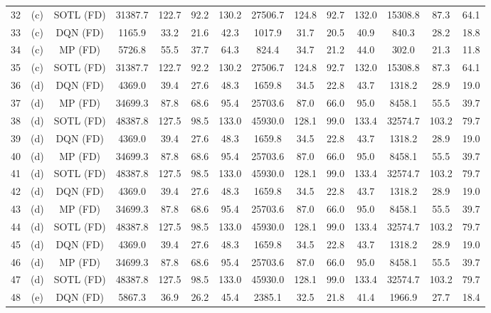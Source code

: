 \begin{table}[htbp]
\begin{tabular}{|c|c|c|c|c|c|c|c|c|c|c|c|c|c|}
32 &  (c) &  SOTL (FD) & 31387.7 & 122.7 &  92.2 & 130.2 & 27506.7 & 124.8 &  92.7 & 132.0 & 15308.8 &  87.3 & 64.1 \\
33 &  (c) &   DQN (FD) &  1165.9 &  33.2 &  21.6 &  42.3 &  1017.9 &  31.7 &  20.5 &  40.9 &   840.3 &  28.2 & 18.8 \\
34 &  (c) &    MP (FD) &  5726.8 &  55.5 &  37.7 &  64.3 &   824.4 &  34.7 &  21.2 &  44.0 &   302.0 &  21.3 & 11.8 \\
35 &  (c) &  SOTL (FD) & 31387.7 & 122.7 &  92.2 & 130.2 & 27506.7 & 124.8 &  92.7 & 132.0 & 15308.8 &  87.3 & 64.1 \\
36 &  (d) &   DQN (FD) &  4369.0 &  39.4 &  27.6 &  48.3 &  1659.8 &  34.5 &  22.8 &  43.7 &  1318.2 &  28.9 & 19.0 \\
37 &  (d) &    MP (FD) & 34699.3 &  87.8 &  68.6 &  95.4 & 25703.6 &  87.0 &  66.0 &  95.0 &  8458.1 &  55.5 & 39.7 \\
38 &  (d) &  SOTL (FD) & 48387.8 & 127.5 &  98.5 & 133.0 & 45930.0 & 128.1 &  99.0 & 133.4 & 32574.7 & 103.2 & 79.7 \\
39 &  (d) &   DQN (FD) &  4369.0 &  39.4 &  27.6 &  48.3 &  1659.8 &  34.5 &  22.8 &  43.7 &  1318.2 &  28.9 & 19.0 \\
40 &  (d) &    MP (FD) & 34699.3 &  87.8 &  68.6 &  95.4 & 25703.6 &  87.0 &  66.0 &  95.0 &  8458.1 &  55.5 & 39.7 \\
41 &  (d) &  SOTL (FD) & 48387.8 & 127.5 &  98.5 & 133.0 & 45930.0 & 128.1 &  99.0 & 133.4 & 32574.7 & 103.2 & 79.7 \\
42 &  (d) &   DQN (FD) &  4369.0 &  39.4 &  27.6 &  48.3 &  1659.8 &  34.5 &  22.8 &  43.7 &  1318.2 &  28.9 & 19.0 \\
43 &  (d) &    MP (FD) & 34699.3 &  87.8 &  68.6 &  95.4 & 25703.6 &  87.0 &  66.0 &  95.0 &  8458.1 &  55.5 & 39.7 \\
44 &  (d) &  SOTL (FD) & 48387.8 & 127.5 &  98.5 & 133.0 & 45930.0 & 128.1 &  99.0 & 133.4 & 32574.7 & 103.2 & 79.7 \\
45 &  (d) &   DQN (FD) &  4369.0 &  39.4 &  27.6 &  48.3 &  1659.8 &  34.5 &  22.8 &  43.7 &  1318.2 &  28.9 & 19.0 \\
46 &  (d) &    MP (FD) & 34699.3 &  87.8 &  68.6 &  95.4 & 25703.6 &  87.0 &  66.0 &  95.0 &  8458.1 &  55.5 & 39.7 \\
47 &  (d) &  SOTL (FD) & 48387.8 & 127.5 &  98.5 & 133.0 & 45930.0 & 128.1 &  99.0 & 133.4 & 32574.7 & 103.2 & 79.7 \\
48 &  (e) &   DQN (FD) &  5867.3 &  36.9 &  26.2 &  45.4 &  2385.1 &  32.5 &  21.8 &  41.4 &  1966.9 &  27.7 & 18.4 \\

\end{tabular}
\end{table}
